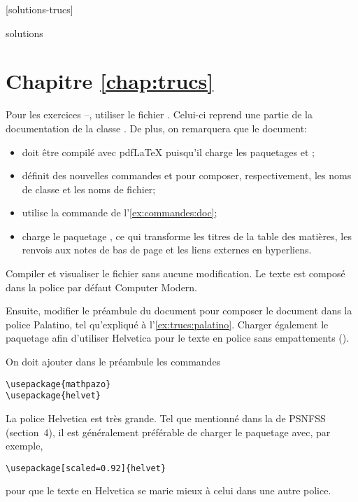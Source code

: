 [solutions-trucs]

\begin{Filesave}{solutions}
\section*{Chapitre \ref*{chap:trucs}}

\end{Filesave}

\noindent%
Pour les exercices
\nolink{\ref{exercice:trucs:1}}--\nolink{\ref{exercice:trucs:n}},
utiliser le fichier . Celui-ci reprend
une partie de la documentation de la classe . De plus,
on remarquera que le document:
\begin{itemize}
\item doit être compilé avec pdf{\LaTeX} puisqu'il charge les
  paquetages  et ;
\item définit des nouvelles commandes \cmdprint{\class} et
  \cmdprint{\fichier} pour composer, respectivement, les noms de
  classe et les noms de fichier;
\item utilise la commande \cmdprint{\doc} de
  l'\autoref{ex:commandes:doc};
\item charge le paquetage , ce qui transforme les titres
  de la table des matières, les renvois aux notes de bas de page et
  les liens externes en hyperliens.
\end{itemize}
\medskip

\begin{exercice}
  \label{exercice:trucs:1}
  Compiler et visualiser le fichier sans aucune modification. Le texte
  est composé dans la police par défaut Computer Modern.

  Ensuite, modifier le préambule du document pour composer le document
  dans la police Palatino, tel qu'expliqué à
  l'\autoref{ex:trucs:palatino}. Charger également le paquetage
   afin d'utiliser Helvetica pour le texte en police sans
  empattements (\cmdprint{\textsf}).
  \begin{sol}
    On doit ajouter dans le préambule les commandes
\begin{lstlisting}
\usepackage{mathpazo}
\usepackage{helvet}
\end{lstlisting}
    La police Helvetica est très grande. Tel que mentionné dans la %
    de PSNFSS (section~4), il est généralement préférable de charger
    le paquetage  avec, par exemple,
\begin{lstlisting}
\usepackage[scaled=0.92]{helvet}
\end{lstlisting}
    pour que le texte en Helvetica se marie mieux à celui dans une
    autre police.
  \end{sol}
\end{exercice}

